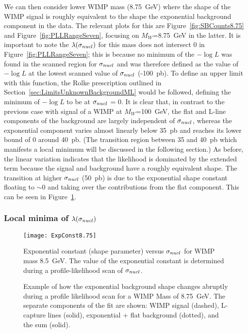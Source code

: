 We can then consider lower WIMP mass (8.75~GeV) where the shape of the WIMP signal is roughly equivalent to the shape the exponential background component in the data.  The relevant plots for this are Figure~\ref{fig:SBCounts8.75} and Figure~\ref{fig:PLLRangeSeven}, focusing on $M_{W}$=8.75~GeV in the latter.  It is important to note the $\lambda(\sigma_{nucl})$ for this mass does not intersect 0 in Figure~\ref{fig:PLLRangeSeven}; this is because no minimum of the $-\log L$ was found in the scanned region for $\signuc$ and was therefore defined as the value of $-\log L$ at the lowest scanned value of $\signuc$ (-100~pb).  To define an upper limit with this function, the Rolke prescription outlined in Section~\ref{sec:LimitsUnknownBackgroundML} would be followed, defining the minimum of $-\log L$ to be at $\signuc$ = 0.  It is clear that, in contrast to the previous case with signal of a WIMP at $M_{W}$=100~GeV, the flat and L-line components of the background are largely independent of $\signuc$, whereas the exponential component varies almost linearly below 35~pb and reaches its lower bound of 0 around 40~pb.  (The transition region between 35 and 40~pb which manifests a local minimum will be discussed in the following section.)  As before, the linear variation indicates that the likelihood is dominated by the extended term because the signal and background have a roughly equivalent shape.  The transition at higher $\signuc$ (50~pb) is due to the exponential shape constant floating to  $\sim0$ and taking over the contributions from the flat component.  This can be seen in Figure~\ref{fig:FitExpoShapeVsSigma}.
	
		\subsubsection{Local minima of $\lambda(\sigma_{nucl})$}
		\label{sec:LLPathoLocalMinima}
			
			\begin{figure}
				\centering
				\texttt{[image: ExpConst8.75]}
				\caption[Exponential constant (shape parameter) versus $\signuc$]
				{Exponential constant (shape parameter) versus $\signuc$ for WIMP mass 8.5~GeV.
				The value of the exponential constant is determined during a profile-likelihood scan
				of $\signuc$.}
				\label{fig:FitExpoShapeVsSigma}
			\end{figure}
	
			\begin{figure}
				\centering
				\caption[Abrupt changed of exponential background shape during fitting]
				{Example of how the exponential background shape changes abruptly during a profile 
				likelihood scan for a WIMP Mass of 8.75~GeV.  The separate components of the fit are shown: 
				WIMP signal (dashed), L-capture lines (solid), exponential + flat background (dotted), and the 
				sum (solid). }
				\label{fig:FitExpoFitExample}
			\end{figure}	

